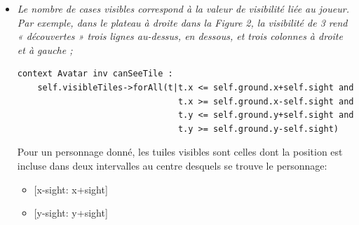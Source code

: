 \documentclass[oneside,a4paper]{book}
\begin{document}
\begin{itemize}
    \item \textit{Le nombre de cases visibles correspond à la valeur de visibilité liée au joueur. Par exemple, dans le plateau à droite dans la Figure 2, la visibilité de 3 rend « découvertes » trois lignes au-dessus, en dessous, et trois colonnes à droite et à gauche ;} 
        \begin{lstlisting}
context Avatar inv canSeeTile : 
    self.visibleTiles->forAll(t|t.x <= self.ground.x+self.sight and
                                t.x >= self.ground.x-self.sight and
                                t.y <= self.ground.y+self.sight and
                                t.y >= self.ground.y-self.sight)
        \end{lstlisting}
        Pour un personnage donné, les tuiles visibles sont celles dont la position est incluse dans deux intervalles au centre desquels se trouve le personnage:
        \begin{itemize}
            \item {[}x-sight: x+sight{]}
            \item {[}y-sight: y+sight{]}
        \end{itemize}
    

\end{itemize}
\end{document}

